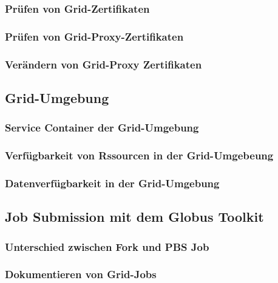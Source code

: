 	\subsubsection{Prüfen von Grid-Zertifikaten}
	\subsubsection{Prüfen von Grid-Proxy-Zertifikaten}
	\subsubsection{Verändern von Grid-Proxy Zertifikaten}

\subsection{Grid-Umgebung}
	\subsubsection{Service Container der Grid-Umgebung}
	\subsubsection{Verfügbarkeit von Rssourcen in der Grid-Umgebeung}
	\subsubsection{Datenverfügbarkeit in der Grid-Umgebung}

\subsection{Job Submission mit dem Globus Toolkit}
	\subsubsection{Unterschied zwischen Fork und PBS Job}
	\subsubsection{Dokumentieren von Grid-Jobs}

